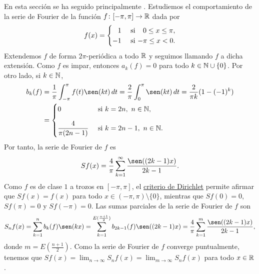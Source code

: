 \documentclass[a4paper, 12pt]{book}
\begin{document}
En esta sección se ha seguido principalmente \cite{duoandikoetxea2}. Estudiemos el comportamiento de la serie de Fourier de la función $f \colon [-\pi,\pi]\to\mathbb R$ dada por
\[f(x) = \begin{cases}
    \phantom{-}1 & $ si $ \phantom{-}0 \leq x \leq \pi, \\
    -1 & $ si $ -\pi \leq x < 0.
\end{cases}\]
Extendemos $f$ de forma $2\pi$-periódica a todo $\mathbb R$ y seguimos llamando $f$ a dicha extensión. Como $f$ es impar, entonces $a_k(f) = 0$ para todo $k \in \mathbb N \cup \{0\}$. Por otro lado, si $k \in \mathbb N$,
\begin{align*}
    b_k(f) &= \frac{1}{\pi}\integral{-\pi}{\pi}{f(t)\sen(kt)} = \frac{2}{\pi}\integral{0}{\pi}{\sen(kt)} = \frac{2}{\pi k}(1-(-1)^k) \\
    &= \begin{cases}
        0 & $ si $ k = 2n, \ n \in \N, \\[10pt]
        \displaystyle \frac{4}{\pi (2n-1)} & $ si $ k = 2n-1, \ n \in \N.
    \end{cases}
\end{align*}
Por tanto, la serie de Fourier de $f$ es
\[Sf(x) = \frac{4}{\pi}\sum_{k=1}^\infty \frac{\sen((2k-1)x)}{2k-1}.\]
Como $f$ es de clase $1$ a trozos en $[-\pi,\pi]$, el \hyperref[1.2.11]{criterio de Dirichlet} permite afirmar que $Sf(x) = f(x)$ para todo $x \in (-\pi,\pi) \setminus \{0\}$, mientras que $Sf(0) = 0$, $Sf(\pi) = 0$ y $Sf(-\pi) = 0$.
Las sumas parciales de la serie de Fourier de $f$ son
\[S_nf(x) = \sum_{k=1}^n b_k(f)\sen(kx) = \sum_{k=1}^{E(\frac{n+1}{2})}b_{2k-1}(f)\sen((2k-1)x) = \frac{4}{\pi}\sum_{k=1}^{m}\frac{\sen((2k-1)x)}{2k-1},\]
donde $m = E(\frac{n+1}{2})$. Como la serie de Fourier de $f$ converge puntualmente, tenemos que $Sf(x) = \lim_{n\to\infty} S_nf(x) = \lim_{m\to\infty} S_nf(x)$ para todo $x \in \mathbb R$.
\end{document}
